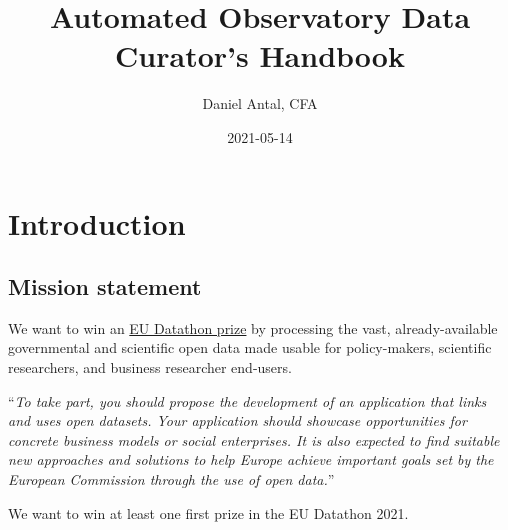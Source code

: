 \documentclass[
  a4paper,
  openany, a4paper, oneside]{book}
\title{Automated Observatory Data Curator's Handbook}
\author{Daniel Antal, CFA}
\date{2021-05-14}
\begin{document}
\maketitle

{
\hypersetup{linkcolor=}
\setcounter{tocdepth}{1}
\tableofcontents
}
\listoffigures
{}
\hypertarget{introduction}{%
\chapter*{Introduction}\label{introduction}}

\hypertarget{mission-statement}{%
\section*{Mission statement}\label{mission-statement}}

We want to win an \href{https://op.europa.eu/en/web/eudatathon}{EU Datathon prize} by processing the vast, already-available governmental and scientific open data made usable for policy-makers, scientific researchers, and business researcher end-users.

``\emph{To take part, you should propose the development of an application that links and uses open datasets. Your application should showcase opportunities for concrete business models or social enterprises. It is also expected to find suitable new approaches and solutions to help Europe achieve important goals set by the European Commission through the use of open data.}''

We want to win at least one first prize in the EU Datathon 2021.
\end{document}

